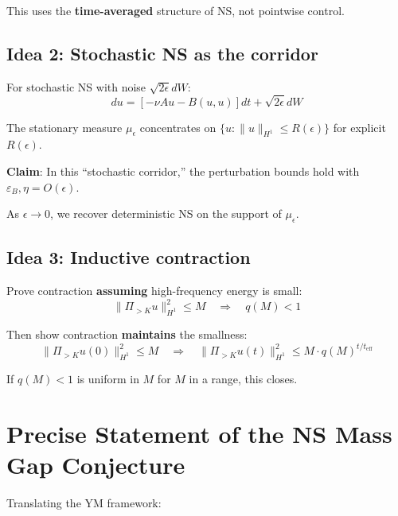 \documentclass[11pt]{article}
\theoremstyle{definition}
\begin{document}
This uses the \textbf{time-averaged} structure of NS, not pointwise control.

\subsection{Idea 2: Stochastic NS as the corridor}

For stochastic NS with noise $\sqrt{2\epsilon} dW$:
\begin{equation}
du = [-\nu Au - B(u,u)]dt + \sqrt{2\epsilon} dW
\end{equation}

The stationary measure $\mu_\epsilon$ concentrates on $\{u : \|u\|_{H^1} \leq R(\epsilon)\}$ for 
explicit $R(\epsilon)$.

\textbf{Claim}: In this ``stochastic corridor,'' the perturbation bounds hold with 
$\varepsilon_B, \eta = O(\epsilon)$.

As $\epsilon \to 0$, we recover deterministic NS on the support of $\mu_\epsilon$.

\subsection{Idea 3: Inductive contraction}

Prove contraction \textbf{assuming} high-frequency energy is small:
\begin{equation}
\|\Pi_{>K} u\|_{H^1}^2 \leq M \quad \Rightarrow \quad q(M) < 1
\end{equation}

Then show contraction \textbf{maintains} the smallness:
\begin{equation}
\|\Pi_{>K} u(0)\|_{H^1}^2 \leq M \quad \Rightarrow \quad \|\Pi_{>K} u(t)\|_{H^1}^2 \leq M \cdot q(M)^{t/t_{\mathrm{eff}}}
\end{equation}

If $q(M) < 1$ is uniform in $M$ for $M$ in a range, this closes.

\section{Precise Statement of the NS Mass Gap Conjecture}

Translating the YM framework:
\end{document}
